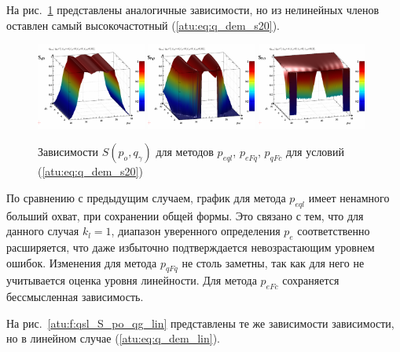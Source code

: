 На рис.~\ref{atu:f:qsl_S_po_qg_s20} представлены аналогичные зависимости,
но из нелинейных членов оставлен самый высокочастотный (\ref{atu:eq:q_dem_s20}).

\begin{figure}[htb!]
  \centerline{
    \includegraphics[width=0.32\textwidth]{p/qls_pe-p_po_qg_Sql_s20.png}
    \hfill
    \includegraphics[width=0.32\textwidth]{p/qls_pe-p_po_qg_SFq_s20.png}
    \hfill
    \includegraphics[width=0.32\textwidth]{p/qls_pe-p_po_qg_SFc_s20.png}
  }
  \caption{Зависимости $S(p_o,q_\gamma)$ для методов $p_{eql}$, $p_{eFq}$, $p_{qFc}$ для условий (\ref{atu:eq:q_dem_s20})}
  \label{atu:f:qsl_S_po_qg_s20}
\end{figure}

По сравнению с предыдущим случаем, график для метода $p_{eql}$
имеет ненамного больший охват, при сохранении общей формы.
Это связано с тем, что для данного случая $k_l=1$,
диапазон уверенного определения $p_e$ соответственно расширяется,
что даже избыточно подтверждается невозрастающим уровнем ошибок.
Изменения для метода $p_{qFq}$ не столь заметны,
так как для него не учитывается оценка уровня линейности.
Для метода $p_{eFc}$ сохраняется бессмысленная зависимость.

На рис.~\ref{atu:f:qsl_S_po_qg_lin} представлены те же зависимости зависимости,
но в линейном случае (\ref{atu:eq:q_dem_lin}).

